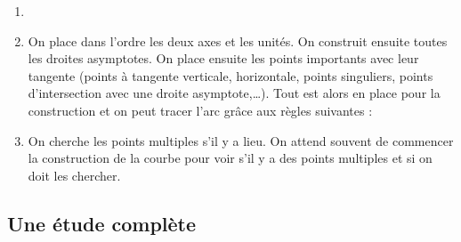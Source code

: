 \documentclass[class=report,crop=false]{standalone}
\begin{document}
\begin{enumerate}
\item {}

\item {}

On
place dans l'ordre les deux axes et les unités. On construit
ensuite toutes les droites asymptotes. On place ensuite les points
importants avec leur tangente (points à tangente verticale,
horizontale, points singuliers, points d'intersection
avec une droite asymptote,\ldots). Tout est alors en place
pour la construction et on peut tracer l'arc grâce aux règles suivantes :






\item {}

On cherche les points multiples s'il y a lieu.
On attend souvent de commencer la construction de la courbe pour
voir s'il y a des points multiples et si on doit les chercher.
\end{enumerate}

\subsection{Une étude complète}
\end{document}
